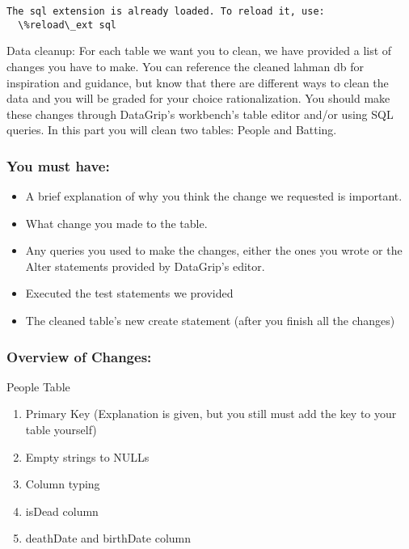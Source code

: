 \documentclass[11pt]{article}
\providecommand{\tightlist}{%
      \setlength{\itemsep}{0pt}\setlength{\parskip}{0pt}}
\begin{document}
    \begin{Verbatim}[commandchars=\\\{\}]
The sql extension is already loaded. To reload it, use:
  \%reload\_ext sql
    \end{Verbatim}

    Data cleanup: For each table we want you to clean, we have provided a
list of changes you have to make. You can reference the cleaned lahman
db for inspiration and guidance, but know that there are different ways
to clean the data and you will be graded for your choice
rationalization. You should make these changes through DataGrip's
workbench's table editor and/or using SQL queries. In this part you will
clean two tables: People and Batting.

\hypertarget{you-must-have}{%
\subsubsection{You must have:}\label{you-must-have}}

\begin{itemize}
\tightlist
\item
  A brief explanation of why you think the change we requested is
  important.
\item
  What change you made to the table.
\item
  Any queries you used to make the changes, either the ones you wrote or
  the Alter statements provided by DataGrip's editor.
\item
  Executed the test statements we provided
\item
  The cleaned table's new create statement (after you finish all the
  changes)
\end{itemize}

\hypertarget{overview-of-changes}{%
\subsubsection{Overview of Changes:}\label{overview-of-changes}}

People Table

\begin{enumerate}
\def\labelenumi{\arabic{enumi}.}
\setcounter{enumi}{-1}
\tightlist
\item
  Primary Key (Explanation is given, but you still must add the key to
  your table yourself)
\item
  Empty strings to NULLs
\item
  Column typing
\item
  isDead column
\item
  deathDate and birthDate column
\end{enumerate}
\end{document}
